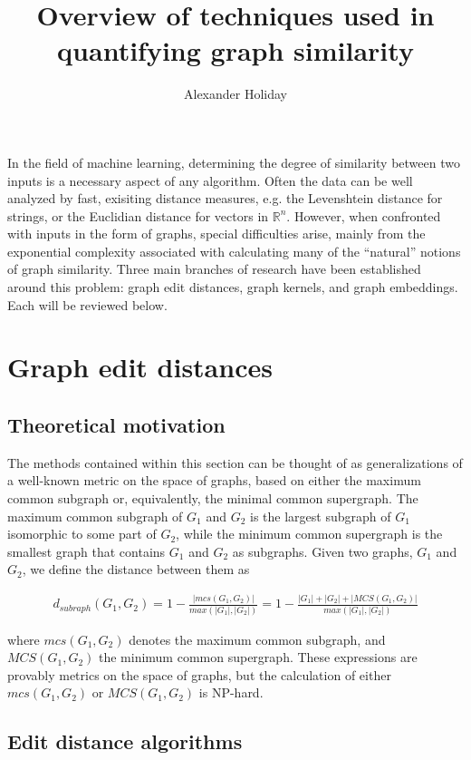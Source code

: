 \documentclass[11pt]{article}
\begin{document}
\title{Overview of techniques used in quantifying graph similarity}
\author{Alexander Holiday}
\date{}
\maketitle

In the field of machine learning, determining the degree of similarity between two inputs is a necessary aspect of any algorithm. Often the data can be well analyzed by fast, exisiting distance measures, e.g. the Levenshtein distance for strings, or the Euclidian distance for vectors in $\mathbb{R}^{n}$. However, when confronted with inputs in the form of graphs, special difficulties arise, mainly from the exponential complexity associated with calculating many of the ``natural'' notions of graph similarity. Three main branches of research have been established around this problem: graph edit distances, graph kernels, and graph embeddings. Each will be reviewed below.

\section{Graph edit distances}
\subsection{Theoretical motivation}
The methods contained within this section can be thought of as generalizations of a well-known metric on the space of graphs, based on either the maximum common subgraph or, equivalently, the minimal common supergraph. The maximum common subgraph of $G_1$ and $G_2$ is the largest subgraph of $G_1$ isomorphic to some part of $G_2$, while the minimum common supergraph is the smallest graph that contains $G_1$ and $G_2$ as subgraphs. Given two graphs, $G_1$ and $G_2$, we define the distance between them as

\begin{align}
d_{subraph}(G_1, G_2) = 1 - \frac{|mcs(G_1, G_2)|}{max(|G_1|, |G_2|)} = 1 - \frac{|G_1| + |G_2| + |MCS(G_1, G_2)|}{max(|G_1|, |G_2|)}
\label{eqn:mcs}
\end{align}

where $mcs(G_1, G_2)$ denotes the maximum common subgraph, and $MCS(G_1, G_2)$ the minimum common supergraph. These expressions are provably metrics on the space of graphs, but the calculation of either $mcs(G_1, G_2)$ or $MCS(G_1, G_2)$ is NP-hard.

\subsection{Edit distance algorithms}
\end{document}
